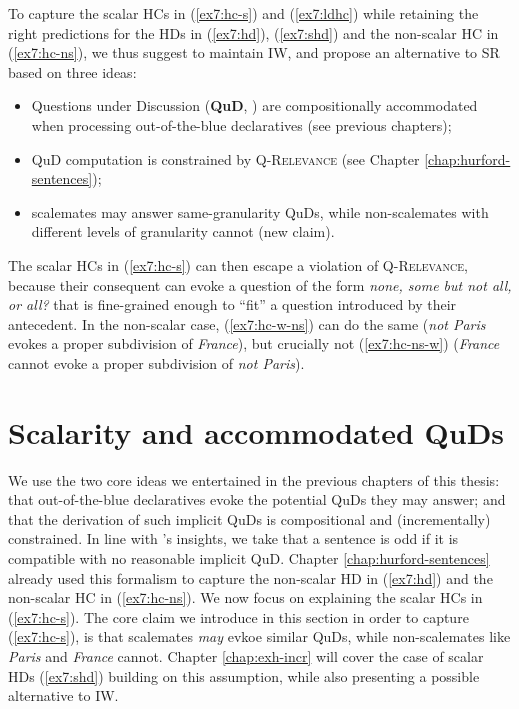 To capture the scalar HCs in (\ref{ex7:hc-s}) and (\ref{ex7:ldhc}) while retaining the right predictions for the HDs in (\ref{ex7:hd}), (\ref{ex7:shd}) and the non-scalar HC in (\ref{ex7:hc-ns}), we thus suggest to maintain IW, and propose an alternative to SR based on three ideas:
\begin{itemize}
	\item Questions under Discussion (\textbf{QuD}, \cite{VanKuppevelt1995,Roberts1996}) are compositionally accommodated when processing out-of-the-blue declaratives (see previous chapters);
	\item QuD computation is constrained by \textsc{Q-Relevance} (see Chapter \ref{chap:hurford-sentences});
	\item scalemates may answer same-granularity QuDs, while non-scalemates with different levels of granularity cannot (new claim).
\end{itemize}
The scalar HCs in (\ref{ex7:hc-s}) can then escape a violation of \textsc{Q-Relevance}, because their consequent can evoke a question of the form \textit{none, some but not all, or all?} that is fine-grained enough to ``fit'' a question introduced by their antecedent. In the non-scalar case, (\ref{ex7:hc-w-ns}) can do the same (\textit{not Paris} evokes a proper subdivision of \textit{France}), but crucially not (\ref{ex7:hc-ns-w}) (\textit{France} cannot evoke a proper subdivision of \textit{not Paris}).



\section{Scalarity and accommodated QuDs}
We use the two core ideas we entertained in the previous chapters of this thesis: that out-of-the-blue declaratives evoke the potential QuDs they may answer; and that the derivation of such implicit QuDs is compositional and (incrementally) constrained. In line with \citet{Katzir2015}'s insights, we take that  a sentence is odd if it is compatible with no reasonable implicit QuD. Chapter \ref{chap:hurford-sentences} already used this formalism to capture the non-scalar HD in (\ref{ex7:hd}) and the non-scalar HC in (\ref{ex7:hc-ns}). We now focus on explaining the scalar HCs in (\ref{ex7:hc-s}). The core claim we introduce in this section in order to capture (\ref{ex7:hc-s}), is that scalemates \textit{may} evkoe similar QuDs, while non-scalemates like \textit{Paris} and \textit{France} cannot. Chapter \ref{chap:exh-incr} will cover the case of scalar HDs (\ref{ex7:shd}) building on this assumption, while also presenting a possible alternative to IW.


